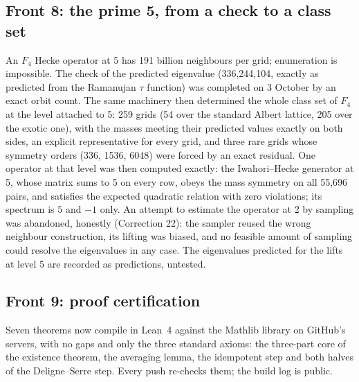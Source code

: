 \documentclass[11pt]{article}
\begin{document}
\subsection{Front 8: the prime 5, from a check to a class set}
An $F_4$ Hecke operator at 5 has 191 billion neighbours per grid; enumeration is impossible. The check of the predicted eigenvalue (336,244,104, exactly as predicted from the Ramanujan $\tau$ function) was completed on 3 October by an exact orbit count. The same machinery then determined the whole class set of $F_4$ at the level attached to 5: 259 grids (54 over the standard Albert lattice, 205 over the exotic one), with the masses meeting their predicted values exactly on both sides, an explicit representative for every grid, and three rare grids whose symmetry orders (336, 1536, 6048) were forced by an exact residual. One operator at that level was then computed exactly: the Iwahori--Hecke generator at 5, whose matrix sums to 5 on every row, obeys the mass symmetry on all 55,696 pairs, and satisfies the expected quadratic relation with zero violations; its spectrum is $5$ and $-1$ only. An attempt to estimate the operator at 2 by sampling was abandoned, honestly (Correction 22): the sampler reused the wrong neighbour construction, its lifting was biased, and no feasible amount of sampling could resolve the eigenvalues in any case. The eigenvalues predicted for the lifts at level 5 are recorded as predictions, untested.

\subsection{Front 9: proof certification}
Seven theorems now compile in Lean~4 against the Mathlib library on GitHub's servers, with no gaps and only the three standard axioms: the three-part core of the existence theorem, the averaging lemma, the idempotent step and both halves of the Deligne--Serre step. Every push re-checks them; the build log is public.
\end{document}
